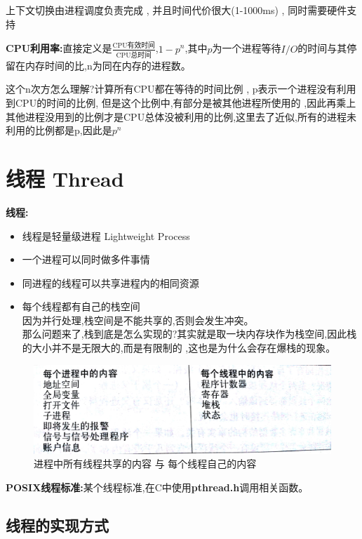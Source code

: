 \documentclass[UTF8,a4paper]{ctexart}
\begin{document}
上下文切换由进程调度负责完成 , 并且时间代价很大(1-1000ms) , 同时需要硬件支持

\textbf{CPU利用率:}直接定义是$\displaystyle{
	 \frac{\text{CPU有效时间}}{\text{CPU总时间}}}
$,$1 - p^n$,其中$p$为一个进程等待$I/O$的时间与其停留在内存时间的比,n为同在内存的进程数。

{这个n次方怎么理解?计算所有CPU都在等待的时间比例 , p表示一个进程没有利用到CPU的时间的比例, 但是这个比例中,有部分是被其他进程所使用的
,因此再乘上其他进程没用到的比例才是CPU总体没被利用的比例,这里去了近似,所有的进程未利用的比例都是p,因此是$p^n$}

\section{线程 Thread}
\textbf{线程:}
\begin{itemize}
	\item 线程是轻量级进程 Lightweight Process
	\item 一个进程可以同时做多件事情
	\item 同进程的线程可以共享进程内的相同资源
	\item 每个线程都有自己的栈空间\\
	      因为并行处理,栈空间是不能共享的,否则会发生冲突。\\
	      那么问题来了,栈到底是怎么实现的?其实就是取一块内存块作为栈空间,因此栈的大小并不是无限大的,而是有限制的
	      ,这也是为什么会存在爆栈的现象。
\end{itemize}

\begin{figure}[H]
	\centering
	\includegraphics[scale = 0.1]{assets/ModernOperatingSystems_8204b.png}
	\caption{进程中所有线程共享的内容 与 每个线程自己的内容}
\end{figure}

\textbf{POSIX线程标准:}某个线程标准,在C中使用\textbf{pthread.h}调用相关函数。

\subsection{线程的实现方式}
\end{document}
